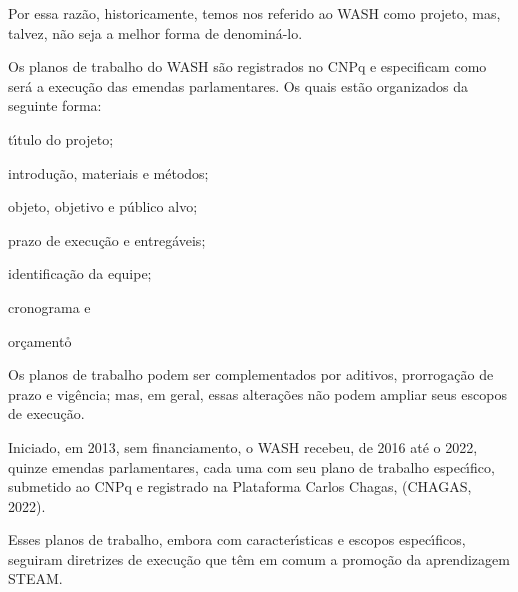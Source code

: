 \documentclass[
12pt,		%
openright,	%
twoside,  %
a4paper,			%
chapter=TITLE,		%
english,			%
french,				%
spanish,			%
brazil				%
]{USPSC-classe/USPSC}
\begin{document}
Por essa raz\~ao, historicamente, temos nos referido ao WASH como projeto, mas, talvez, n\~ao seja a melhor forma de denomin\'a-lo.









Os planos de trabalho do WASH s\~ao registrados no CNPq e especificam como ser\'a a execu\c{c}\~ao das emendas parlamentares. Os quais est\~ao organizados da seguinte forma:










\begin{alineas}
\item t\'{\i}tulo do projeto;
\item introdu\c{c}\~ao, materiais e m\'etodos;
\item objeto, objetivo e p\'ublico alvo;
\item prazo de execu\c{c}\~ao e entreg\'aveis;
\item identifica\c{c}\~ao da equipe;
\item cronograma e
\item or\c{c}amento\r\n
\end{alineas}

Os planos de trabalho podem ser complementados por aditivos, prorroga\c{c}\~ao de prazo e vig\^encia; mas, em geral, essas altera\c{c}\~oes n\~ao podem ampliar seus escopos de execu\c{c}\~ao.









Iniciado, em 2013, sem financiamento, o WASH recebeu, de 2016 at\'e o 2022, quinze emendas parlamentares, cada uma com seu plano de trabalho espec\'{\i}fico, submetido ao CNPq e registrado na Plataforma Carlos Chagas, (CHAGAS, 2022).









Esses planos de trabalho, embora com caracter\'{\i}sticas e escopos espec\'{\i}ficos, seguiram diretrizes de execu\c{c}\~ao que t\^em em comum a promo\c{c}\~ao da aprendizagem STEAM.
\end{document}
